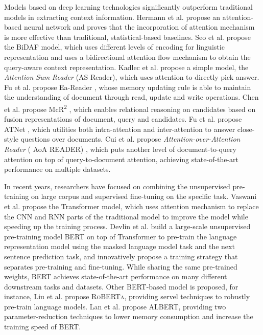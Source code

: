\documentclass[sigconf, screen]{acmart}
\begin{document}
Models based on deep learning technologies significantly outperform traditional models in extracting context information. Hermann et al. \cite{hermannTeachingMachinesRead2015} propose an attention-based neural network and proves that the incorporation of attention mechanism is more effective than traditional, statistical-based baselines. Seo et al. propose the BiDAF \cite{seoBidirectionalAttentionFlow2017} model, which uses different levels of encoding for linguistic representation and uses a bidirectional attention flow mechanism to obtain the query-aware context representation. Kadlec et al. \cite{kadlecTextUnderstandingAttention2016} propose a simple model, the \emph{Attention Sum Reader} (AS Reader), which uses attention to directly pick answer. Fu et al. propose Ea-Reader \cite{fuEAReaderEnhance2019}, whose memory updating rule is able to maintain the understanding of document through read, update and write operations. Chen et al. propose McR\textsuperscript{2} \cite{chenMultichoiceRelationalReasoning2020}, which enables relational reasoning on candidates based on fusion representations of document, query and candidates. Fu et al. propose ATNet \cite{fuATNetAnsweringClozeStyle2019}, which utilities both intra-attention and inter-attention to answer close-style questions over documents. Cui et al. propose \emph{Attention-over-Attention Reader} ( AoA READER) \cite{cuiAttentionoverAttentionNeuralNetworks2017}, which puts another level of document-to-query attention on top of query-to-document attention, achieving state-of-the-art performance on multiple datasets.

In recent years, researchers have focused on combining the unsupervised pre-training on large corpus and supervised fine-tuning on the specific task. Vaswani et al. propose the Transformer \cite{vaswaniAttentionAllYou2017} model, which uses attention mechanism to replace the CNN and RNN parts of the traditional model to improve the model while speeding up the training process. Devlin et al. build a large-scale unsupervised pre-training model BERT \cite{devlinBERTPretrainingDeep2019} on top of Transformer to pre-train the language representation model using the masked language model task and the next sentence prediction task, and innovatively propose a training strategy that separates pre-training and fine-tuning. While sharing the same pre-trained weights, BERT achieves state-of-the-art performance on many different down\-stream tasks and datasets. Other BERT-based model is proposed, for instance, Liu et al. propose {\scshape RoBERTa}\cite{liuRoBERTaRobustlyOptimized2019}, providing servel techniques to robustly pre-train language models. Lan et al. propose ALBERT\cite{lanALBERTLiteBERT2019}, providing two parameter-reduction techniques to lower memory consumption and increase the training speed of BERT.
\end{document}
